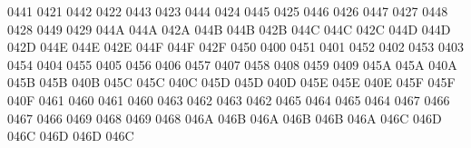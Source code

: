  0441 0421 %
 0442 0422 %
 0443 0423 %
 0444 0424 %
 0445 0425 %
 0446 0426 %
 0447 0427 %
 0448 0428 %
 0449 0429 %
\setcclcucx 044A 044A 042A %
\setcclcucx 044B 044B 042B %
\setcclcucx 044C 044C 042C %
\setcclcucx 044D 044D 042D %
\setcclcucx 044E 044E 042E %
\setcclcucx 044F 044F 042F %
 0450 0400 %
 0451 0401 %
 0452 0402 %
 0453 0403 %
 0454 0404 %
 0455 0405 %
 0456 0406 %
 0457 0407 %
 0458 0408 %
 0459 0409 %
\setcclcucx 045A 045A 040A %
\setcclcucx 045B 045B 040B %
\setcclcucx 045C 045C 040C %
\setcclcucx 045D 045D 040D %
\setcclcucx 045E 045E 040E %
\setcclcucx 045F 045F 040F %
 0461 0460 %
 0461 0460 %
 0463 0462 %
 0463 0462 %
 0465 0464 %
 0465 0464 %
 0467 0466 %
 0467 0466 %
 0469 0468 %
 0469 0468 %
\setcclcucx 046A 046B 046A %
\setcclcucx 046B 046B 046A %
\setcclcucx 046C 046D 046C %
\setcclcucx 046D 046D 046C %
